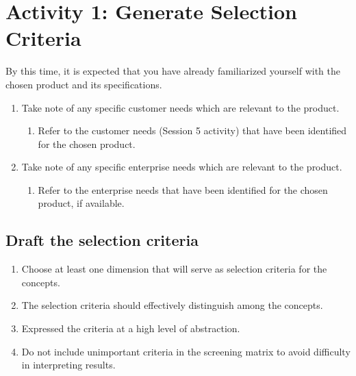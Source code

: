 \section{Activity 1: Generate Selection Criteria}

By this time, it is expected that you have already familiarized yourself with the chosen product and its specifications.
 \begin{enumerate}
        \item Take note of any specific customer needs which are relevant to the product.
        \begin{enumerate}
            \item Refer to the customer needs (Session 5 activity) that have been identified for the chosen product.
        \end{enumerate}
        \item Take note of any specific enterprise needs which are relevant to the product.
        \begin{enumerate}
            \item Refer to the enterprise needs that have been identified for the chosen product, if available.
        \end{enumerate}

    \end{enumerate}

\subsection{Draft the selection criteria}
        \begin{enumerate}
            \item Choose at least one dimension that will serve as selection criteria for the concepts.
            \item The selection criteria should effectively distinguish among the concepts.
            \item Expressed the criteria at a high level of abstraction.
            \item Do not include unimportant criteria in the screening matrix to avoid difficulty in interpreting results.
        \end{enumerate}

